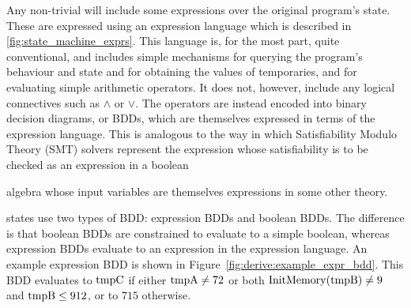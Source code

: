 \noindent
Any non-trivial {\StateMachine} will include some expressions over the
original program's state.  These are expressed using an expression
language which is described in \autoref{fig:state_machine_exprs}.
This language is, for the most part, quite conventional, and includes
simple mechanisms for querying the program's behaviour and state and
for obtaining the values of {\StateMachine} temporaries, and for
evaluating simple arithmetic operators.  It does not, however, include
any logical connectives such as $\wedge$ or $\vee$.  The operators are
instead encoded into binary decision diagrams, or
BDDs\cite{Brace1990}, which are themselves expressed in terms of the
expression language.  This is analogous to the way in which
Satisfiability Modulo Theory (SMT) solvers represent the expression
whose satisfiability is to be checked as an expression in a boolean
\begin{wrapfigure}{r}{5cm}
  \vspace{-12pt}
  \vspace{-12pt}
\end{wrapfigure}
algebra whose input variables are themselves expressions in some other
theory.

\STateMachine{} states use two types of BDD: expression BDDs and
boolean BDDs.  The difference is that boolean BDDs are
constrained to evaluate to a simple boolean, whereas expression BDDs
evaluate to an expression in the expression language.  An example
expression BDD is shown in Figure~\ref{fig:derive:example_expr_bdd}.
This BDD evaluates to $\mathrm{tmpC}$ if either $\mathrm{tmpA} \not= 72$ or
both $\mathrm{InitMemory}(\mathrm{tmpB}) \not= 9$ and $\mathrm{tmpB} \leq 912$, or to
$715$ otherwise.

